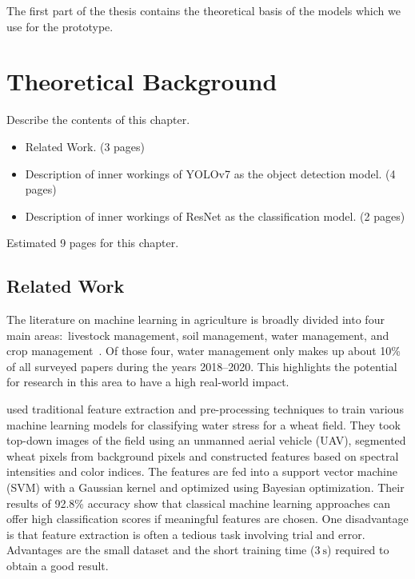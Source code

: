 \documentclass[draft,final]{vutinfth} %
\begin{document}
The first part of the thesis contains the theoretical basis of the
models which we use for the prototype. 

\chapter{Theoretical Background}
\label{chap:background}

Describe the contents of this chapter.

\begin{itemize}
\item Related Work. (3 pages)
\item Description of inner workings of YOLOv7 as the object detection
  model. (4 pages)
\item Description of inner workings of ResNet as the classification
  model. (2 pages)
\end{itemize}

Estimated 9 pages for this chapter.

\section{Related Work}
\label{sec:related-work}

The literature on machine learning in agriculture is broadly divided
into four main areas:~livestock management, soil management, water
management, and crop management~\cite{benos2021}. Of those four, water
management only makes up about 10\% of all surveyed papers during the
years 2018--2020. This highlights the potential for research in this
area to have a high real-world impact.

\textcite{su2020} used traditional feature extraction and
pre-processing techniques to train various machine learning models for
classifying water stress for a wheat field. They took top-down images
of the field using an unmanned aerial vehicle (UAV), segmented wheat
pixels from background pixels and constructed features based on
spectral intensities and color indices. The features are fed into a
support vector machine (SVM) with a Gaussian kernel and optimized
using Bayesian optimization. Their results of 92.8\% accuracy show
that classical machine learning approaches can offer high
classification scores if meaningful features are chosen. One
disadvantage is that feature extraction is often a tedious task
involving trial and error. Advantages are the small dataset and the
short training time ($\qty{3}{\second}$) required to obtain a good
result.
\end{document}
